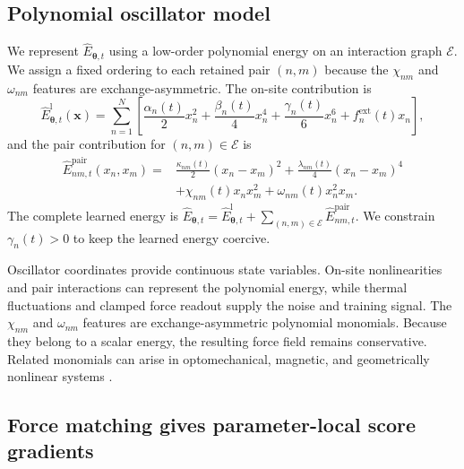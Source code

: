 \documentclass[referee,lineno,pdflatex,sn-nature]{sn-jnl}
\newcommand{\vect}[1]{\boldsymbol{#1}}
\newcommand{\Ehat}{\widehat E}
\begin{document}
\subsection{Polynomial oscillator model}

We represent $\Ehat_{\vect\theta,t}$ using a low-order polynomial energy on an
interaction graph $\mathcal E$. We assign a fixed ordering to each retained pair
$(n,m)$ because the $\chi_{nm}$ and $\omega_{nm}$ features are
exchange-asymmetric. The on-site contribution is
\begin{equation}\label{eq:local-energy}
 \Ehat^{\mathrm l}_{\vect\theta,t}(\vect x)
 =\sum_{n=1}^{N}\left[
 \frac{\alpha_n(t)}{2}x_n^2+
 \frac{\beta_n(t)}{4}x_n^4+
 \frac{\gamma_n(t)}{6}x_n^6+f_n^{\mathrm{ext}}(t)x_n\right],
\end{equation}
and the pair contribution for $(n,m)\in\mathcal E$ is
\begin{align}\label{eq:pair-energy}
 \Ehat^{\mathrm{pair}}_{nm,t}(x_n,x_m)
 ={}&\frac{\kappa_{nm}(t)}{2}(x_n-x_m)^2
 +\frac{\lambda_{nm}(t)}{4}(x_n-x_m)^4 \nonumber\\
 &+\chi_{nm}(t)x_nx_m^2+\omega_{nm}(t)x_n^2x_m .
\end{align}
The complete learned energy is
$\Ehat_{\vect\theta,t}=\Ehat^{\mathrm l}_{\vect\theta,t}
+\sum_{(n,m)\in\mathcal E}\Ehat^{\mathrm{pair}}_{nm,t}$.
We constrain $\gamma_n(t)>0$ to keep the learned energy coercive.

Oscillator coordinates provide continuous state variables. On-site nonlinearities
and pair interactions can represent the polynomial energy, while thermal
fluctuations and clamped force readout supply the noise and training signal. The
$\chi_{nm}$ and $\omega_{nm}$ features are exchange-asymmetric polynomial monomials.
Because they belong to a scalar energy, the resulting force field remains
conservative. Related monomials can arise in optomechanical, magnetic, and
geometrically nonlinear systems
\cite{sankey2010strong,serra2018tunable,serra2016mechanical}.

\subsection{Force matching gives parameter-local score gradients}
\end{document}

